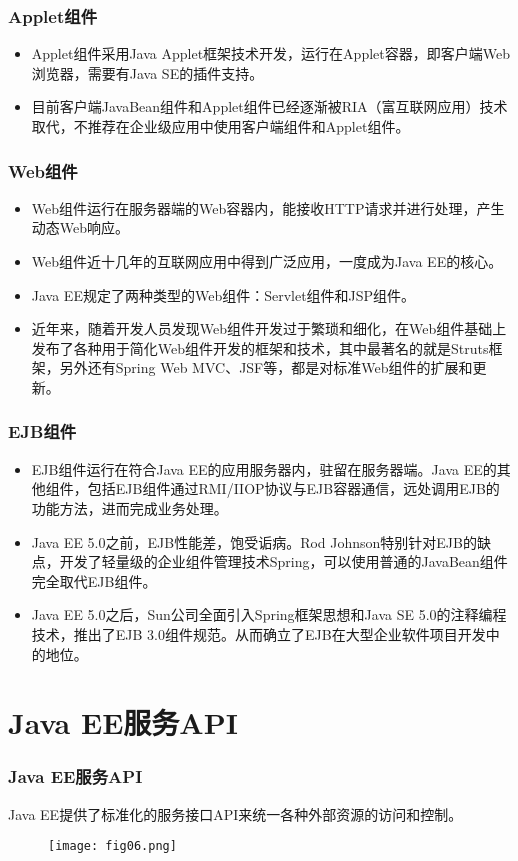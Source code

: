 \begin{frame}
\frametitle{Applet组件} 
\begin{itemize}
\item Applet组件采用Java Applet框架技术开发，运行在Applet容器，即客户端Web浏览器，需要有Java SE的插件支持。
\item 目前客户端JavaBean组件和Applet组件已经逐渐被RIA（富互联网应用）技术取代，不推荐在企业级应用中使用客户端组件和Applet组件。
\end{itemize}
\end{frame}

\begin{frame}
\frametitle{Web组件} 
\begin{itemize}
\item Web组件运行在服务器端的Web容器内，能接收HTTP请求并进行处理，产生动态Web响应。
\item Web组件近十几年的互联网应用中得到广泛应用，一度成为Java EE的核心。
\item Java EE规定了两种类型的Web组件：Servlet组件和JSP组件。
\item 近年来，随着开发人员发现Web组件开发过于繁琐和细化，在Web组件基础上发布了各种用于简化Web组件开发的框架和技术，其中最著名的就是Struts框架，另外还有Spring Web MVC、JSF等，都是对标准Web组件的扩展和更新。
\end{itemize}
\end{frame}

\begin{frame}
\frametitle{EJB组件} 
\begin{itemize}
\item EJB组件运行在符合Java EE的应用服务器内，驻留在服务器端。Java EE的其他组件，包括EJB组件通过RMI/IIOP协议与EJB容器通信，远处调用EJB的功能方法，进而完成业务处理。
\item Java EE 5.0之前，EJB性能差，饱受诟病。Rod Johnson特别针对EJB的缺点，开发了轻量级的企业组件管理技术Spring，可以使用普通的JavaBean组件完全取代EJB组件。
\item Java EE 5.0之后，Sun公司全面引入Spring框架思想和Java SE 5.0的注释编程技术，推出了EJB 3.0组件规范。从而确立了EJB在大型企业软件项目开发中的地位。
\end{itemize}
\end{frame}

\section{Java EE服务API}

\begin{frame}
\frametitle{Java EE服务API} 

Java EE提供了标准化的服务接口API来统一各种外部资源的访问和控制。
\begin{figure}
\centering
\texttt{[image: fig06.png]}
\end{figure} 
\end{frame}

